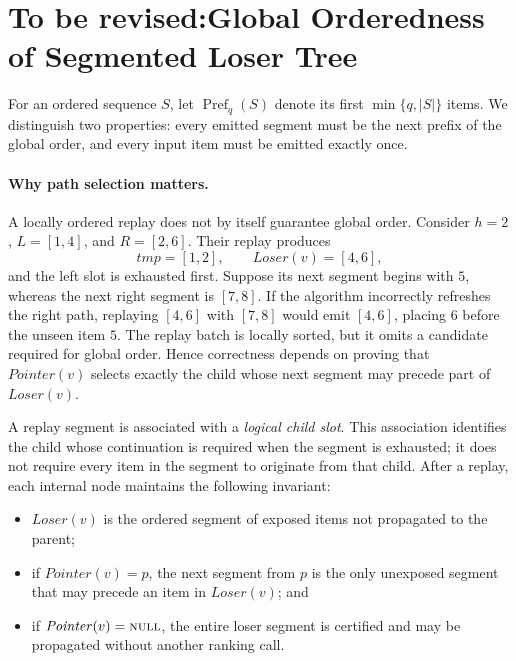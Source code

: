 \section{To be revised:Global Orderedness of Segmented Loser Tree}
\label{sec:appendix-segment-correctness}

For an ordered sequence $S$, let $\operatorname{Pref}_q(S)$ denote its
first $\min\{q,|S|\}$ items. We distinguish two properties: every emitted
segment must be the next prefix of the global order, and every input item
must be emitted exactly once.

\paragraph{Why path selection matters.}
A locally ordered replay does not by itself guarantee global order.
Consider $h=2$, $L=[1,4]$, and $R=[2,6]$. Their replay produces
\[
tmp=[1,2],\qquad \mathit{Loser}(v)=[4,6],
\]
and the left slot is exhausted first. Suppose its next segment begins
with $5$, whereas the next right segment is $[7,8]$. If the algorithm
incorrectly refreshes the right path, replaying $[4,6]$ with $[7,8]$
would emit $[4,6]$, placing $6$ before the unseen item $5$. The replay
batch is locally sorted, but it omits a candidate required for global
order. Hence correctness depends on proving that
$\mathit{Pointer}(v)$ selects exactly the child whose next segment may
precede part of $\mathit{Loser}(v)$.

A replay segment is associated with a \emph{logical child slot}.
This association identifies the child whose continuation is required
when the segment is exhausted; it does not require every item in the
segment to originate from that child. After a replay, each internal node
maintains the following invariant:

\begin{itemize}
  \item $\mathit{Loser}(v)$ is the ordered segment of exposed items not propagated to the parent;
  \item if $\mathit{Pointer}(v)=p$, the next segment from $p$ is the only unexposed segment that may precede an item in $\mathit{Loser}(v)$; and
  \item if $\mathit{Pointer}(v)=\textsc{null}$, the entire loser segment is certified and may be propagated without another ranking call.
\end{itemize}

